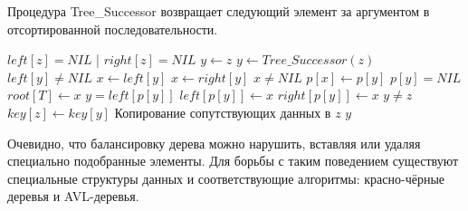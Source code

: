 \documentclass[11pt]{article}
\begin{document}
Процедура Tree\_Successor возвращает следующий элемент за аргументом в отсортированной последовательности.

\begin{codebox}
\li \If $left[z] = NIL$ | $right[z] = NIL$
\li   \Then $y \gets z$
\li   \Else $y \gets Tree\_Successor(z)$
  \End
\li \If $left[y] \neq NIL$
\li   \Then $x \gets left[y]$
\li   \Else $x \gets right[y]$
  \End
\li \If $x \neq NIL$
\li   \Then $p[x] \gets p[y]$
  \End
\li \If $p[y] = NIL$
\li   \Then $root[T] \gets x$
\li   \Else \If $y = left[p[y]]$
\li         \Then $left[p[y]] \gets x$
\li         \Else $right[p[y]] \gets x$
  \End
\End
\li \If $y \neq z$
\li   \Then $key[z] \gets key[y]$
\li   \Comment Копирование сопутствующих данных в $z$
  \End
\li \Return $y$
\End
\end{codebox}

Очевидно, что балансировку дерева можно нарушить, вставляя или удаляя специально подобранные элементы. Для борьбы с таким поведением существуют специальные структуры данных и соответствующие алгоритмы: красно-чёрные деревья и AVL-деревья.
\end{document}

